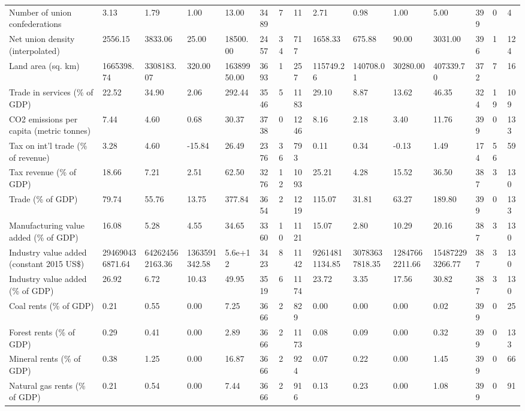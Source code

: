 \begin{longtable}{lllllllllllllll}
Number of union confederations & 3.13 & 1.79 & 1.00 & 13.00 & 3489 & 7 & 11 & 2.71 & 0.98 & 1.00 & 5.00 & 399 & 0 & 4\\
Net union density (interpolated) & 2556.15 & 3833.06 & 25.00 & 18500.00 & 2457 & 34 & 717 & 1658.33 & 675.88 & 90.00 & 3031.00 & 396 & 1 & 124\\
Land area (sq. km) & 1665398.74 & 3308183.07 & 320.00 & 16389950.00 & 3693 & 1 & 257 & 115749.26 & 140708.01 & 30280.00 & 407339.70 & 372 & 7 & 16\\
Trade in services (\% of GDP) & 22.52 & 34.90 & 2.06 & 292.44 & 3546 & 5 & 1183 & 29.10 & 8.87 & 13.62 & 46.35 & 324 & 19 & 109\\
\addlinespace
CO2 emissions per capita (metric tonnes) & 7.44 & 4.60 & 0.68 & 30.37 & 3738 & 0 & 1246 & 8.16 & 2.18 & 3.40 & 11.76 & 399 & 0 & 133\\
Tax on int'l trade (\% of revenue) & 3.28 & 4.60 & -15.84 & 26.49 & 2376 & 36 & 793 & 0.11 & 0.34 & -0.13 & 1.49 & 174 & 56 & 59\\
Tax revenue (\% of GDP) & 18.66 & 7.21 & 2.51 & 62.50 & 3276 & 12 & 1093 & 25.21 & 4.28 & 15.52 & 36.50 & 387 & 3 & 130\\
Trade (\% of GDP) & 79.74 & 55.76 & 13.75 & 377.84 & 3654 & 2 & 1219 & 115.07 & 31.81 & 63.27 & 189.80 & 399 & 0 & 133\\
Manufacturing value added (\% of GDP) & 16.08 & 5.28 & 4.55 & 34.65 & 3360 & 10 & 1121 & 15.07 & 2.80 & 10.29 & 20.16 & 387 & 3 & 130\\
\addlinespace
Industry value added (constant 2015 US\$) & 294690436871.64 & 642624562163.36 & 1363591342.58 & 5.6e+12 & 3423 & 8 & 1142 & 92614811134.85 & 30783637818.35 & 12847662211.66 & 154872293266.77 & 387 & 3 & 130\\
Industry value added (\% of GDP) & 26.92 & 6.72 & 10.43 & 49.95 & 3519 & 6 & 1174 & 23.72 & 3.35 & 17.56 & 30.82 & 387 & 3 & 130\\
Coal rents (\% of GDP) & 0.21 & 0.55 & 0.00 & 7.25 & 3666 & 2 & 829 & 0.00 & 0.00 & 0.00 & 0.02 & 399 & 0 & 25\\
Forest rents (\% of GDP) & 0.29 & 0.41 & 0.00 & 2.89 & 3666 & 2 & 1173 & 0.08 & 0.09 & 0.00 & 0.32 & 399 & 0 & 133\\
Mineral rents (\% of GDP) & 0.38 & 1.25 & 0.00 & 16.87 & 3666 & 2 & 924 & 0.07 & 0.22 & 0.00 & 1.45 & 399 & 0 & 66\\
\addlinespace
Natural gas rents (\% of GDP) & 0.21 & 0.54 & 0.00 & 7.44 & 3666 & 2 & 916 & 0.13 & 0.23 & 0.00 & 1.08 & 399 & 0 & 91\\

\end{longtable}
